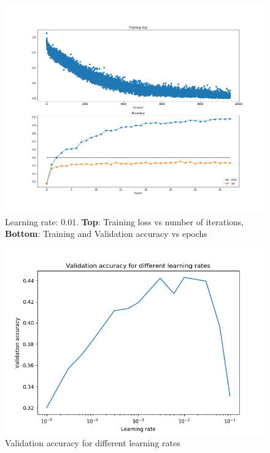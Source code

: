 \documentclass[12pt,twoside]{article}
\begin{document}
\begin{figure}[!htbp]
\centering %
\includegraphics[width = 0.8\hsize]{./figures/l_rate_0_01.png} %
\caption{Learning rate: 0.01. \textbf{Top}: Training loss vs number of iterations, \textbf{Bottom}: Training and Validation accuracy vs epochs} %
\label{lrate0_01}
\end{figure}

\begin{figure}[!htbp]
\centering %
\includegraphics[width = 0.8\hsize]{./figures/learning_rate_val_accuracy.png} %
\caption{Validation accuracy for different learning rates} %
\label{learnin_rate_val_acc}
\end{figure}
\end{document}
